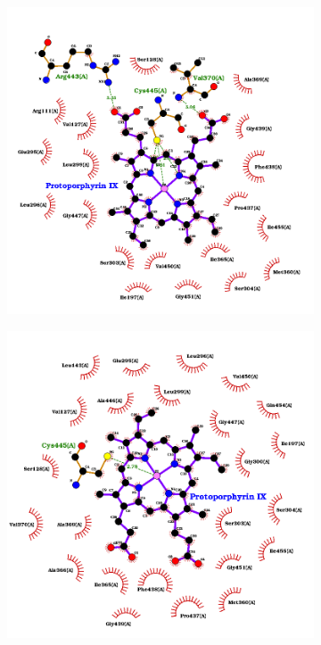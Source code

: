 \documentclass[12pt]{article}
\begin{document}
	\FloatBarrier
	\begin{figure}[h!]
		\centering
		\begin{subfigure}[h!]{0.35\textwidth}
			\hspace{2cm}
			\includegraphics[width=\textwidth]{../5/propose/Dock/best.png}
			\caption{}
		\end{subfigure}
		\hfill
		\begin{subfigure}[h!]{0.35\textwidth}
			\hspace{-2cm}
			\includegraphics[width=\textwidth]{../5/propose/Dock/best2.png}

\end{subfigure}
\end{figure}
\end{document}
